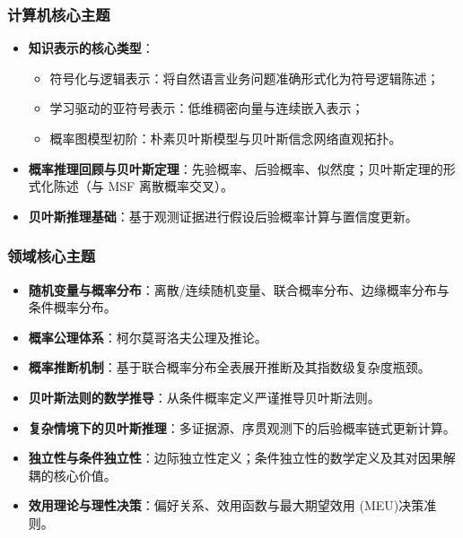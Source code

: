\subsubsection{计算机核心主题}
\begin{itemize}
    \item \textbf{知识表示的核心类型}：
    \begin{itemize}
        \item 符号化与逻辑表示：将自然语言业务问题准确形式化为符号逻辑陈述；
        \item 学习驱动的亚符号表示：低维稠密向量与连续嵌入表示；
        \item 概率图模型初阶：朴素贝叶斯模型与贝叶斯信念网络直观拓扑。
    \end{itemize}
    \item \textbf{概率推理回顾与贝叶斯定理}：先验概率、后验概率、似然度；贝叶斯定理的形式化陈述（与 MSF 离散概率交叉）。
    \item \textbf{贝叶斯推理基础}：基于观测证据进行假设后验概率计算与置信度更新。
\end{itemize}

\subsubsection{领域核心主题}
\begin{itemize}
    \item \textbf{随机变量与概率分布}：离散/连续随机变量、联合概率分布、边缘概率分布与条件概率分布。
    \item \textbf{概率公理体系}：柯尔莫哥洛夫公理及推论。
    \item \textbf{概率推断机制}：基于联合概率分布全表展开推断及其指数级复杂度瓶颈。
    \item \textbf{贝叶斯法则的数学推导}：从条件概率定义严谨推导贝叶斯法则。
    \item \textbf{复杂情境下的贝叶斯推理}：多证据源、序贯观测下的后验概率链式更新计算。
    \item \textbf{独立性与条件独立性}：边际独立性定义；条件独立性的数学定义及其对因果解耦的核心价值。
    \item \textbf{效用理论与理性决策}：偏好关系、效用函数与最大期望效用 (MEU)决策准则。
\end{itemize}


